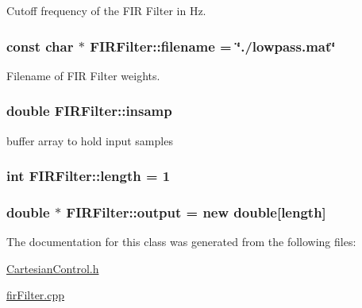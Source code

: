 Cutoff frequency of the F\+IR Filter in Hz. 

\subsubsection[{\texorpdfstring{filename}{filename}}]{\setlength{\rightskip}{0pt plus 5cm}const char $\ast$ F\+I\+R\+Filter\+::filename = \char`\"{}./lowpass.\+mat\char`\"{}}\hypertarget{classFIRFilter_a902770591db045df300f22910625c62a}{}\label{classFIRFilter_a902770591db045df300f22910625c62a}


Filename of F\+IR Filter weights. 

\subsubsection[{\texorpdfstring{insamp}{insamp}}]{\setlength{\rightskip}{0pt plus 5cm}double F\+I\+R\+Filter\+::insamp}\hypertarget{classFIRFilter_a9a3f96578a96a8dd1fce63635483d609}{}\label{classFIRFilter_a9a3f96578a96a8dd1fce63635483d609}


buffer array to hold input samples 

\subsubsection[{\texorpdfstring{length}{length}}]{\setlength{\rightskip}{0pt plus 5cm}int F\+I\+R\+Filter\+::length = 1}\hypertarget{classFIRFilter_a4e697a78993656c942005939a3439b3f}{}\label{classFIRFilter_a4e697a78993656c942005939a3439b3f}
\subsubsection[{\texorpdfstring{output}{output}}]{\setlength{\rightskip}{0pt plus 5cm}double $\ast$ F\+I\+R\+Filter\+::output = new double\mbox{[}{\bf length}\mbox{]}}\hypertarget{classFIRFilter_a459c9679495d712b1324c559c97f573e}{}\label{classFIRFilter_a459c9679495d712b1324c559c97f573e}


The documentation for this class was generated from the following files\+:\begin{DoxyCompactItemize}
\item 
\hyperlink{CartesianControl_8h}{Cartesian\+Control.\+h}\item 
\hyperlink{firFilter_8cpp}{fir\+Filter.\+cpp}\end{DoxyCompactItemize}

